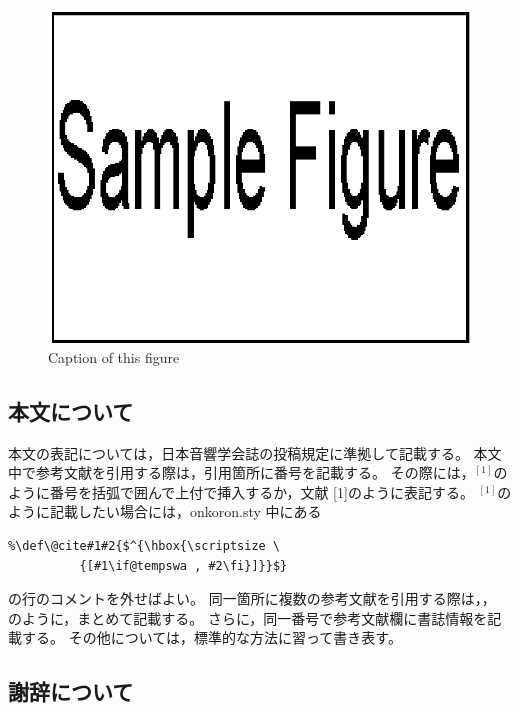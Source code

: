 \documentclass[10pt,twocolumn]{jarticle} %
\begin{document}
\begin{figure}[tb]
\begin{center}
\includegraphics[width=0.8\columnwidth]{sample.eps}
\vspace{-10pt}     %
\end{center}
\caption{Caption of this figure}
\label{fig:thatfigure}
\end{figure}
%
\subsection{本文について}

本文の表記については，日本音響学会誌の投稿規定に準拠して記載する。
本文中で参考文献を引用する際は，引用箇所に番号を記載する。
その際には，$^{[1]}$のように番号を括弧で囲んで上付で挿入するか，文献
[1]のように表記する。
$^{[1]}$のように記載したい場合には，onkoron.sty 中にある
\begin{verbatim}
%\def\@cite#1#2{$^{\hbox{\scriptsize \
          {[#1\if@tempswa , #2\fi}]}}$}
\end{verbatim}
の行のコメントを外せばよい。
同一箇所に複数の参考文献を引用する際は，\cite{article,sansho}，
\cite{article,book,taka}のように，まとめて記載する。
さらに，同一番号で参考文献欄に書誌情報を記載する。
その他については，標準的な方法に習って書き表す\cite{sansho}。

\subsection{謝辞について}
\end{document}
